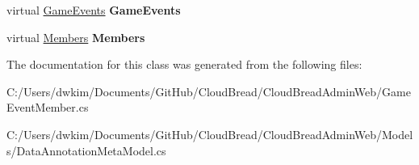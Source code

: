 \begin{DoxyCompactItemize}
\item 
virtual \hyperlink{class_cloud_bread_admin_web_1_1_game_events}{Game\+Events} {\bfseries Game\+Events}\hypertarget{class_cloud_bread_admin_web_1_1_game_event_member_ae56ccac6b760bafb3a2bffadeb7afd9f}{}\label{class_cloud_bread_admin_web_1_1_game_event_member_ae56ccac6b760bafb3a2bffadeb7afd9f}

\item 
virtual \hyperlink{class_cloud_bread_admin_web_1_1_members}{Members} {\bfseries Members}\hypertarget{class_cloud_bread_admin_web_1_1_game_event_member_a9bb13544fabf664de6ae66a867301000}{}\label{class_cloud_bread_admin_web_1_1_game_event_member_a9bb13544fabf664de6ae66a867301000}

\end{DoxyCompactItemize}


The documentation for this class was generated from the following files\+:\begin{DoxyCompactItemize}
\item 
C\+:/\+Users/dwkim/\+Documents/\+Git\+Hub/\+Cloud\+Bread/\+Cloud\+Bread\+Admin\+Web/Game\+Event\+Member.\+cs\item 
C\+:/\+Users/dwkim/\+Documents/\+Git\+Hub/\+Cloud\+Bread/\+Cloud\+Bread\+Admin\+Web/\+Models/Data\+Annotation\+Meta\+Model.\+cs\end{DoxyCompactItemize}
